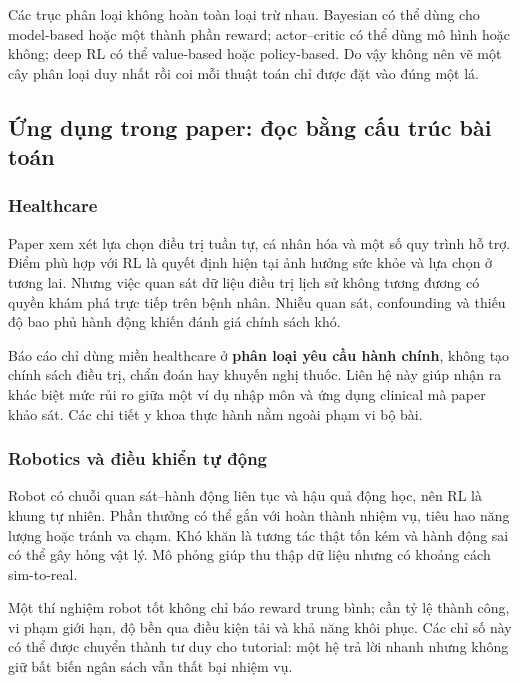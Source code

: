 Các trục phân loại không hoàn toàn loại trừ nhau. Bayesian có thể dùng
cho model-based hoặc một thành phần reward; actor--critic có thể dùng mô
hình hoặc không; deep RL có thể value-based hoặc policy-based. Do vậy
không nên vẽ một cây phân loại duy nhất rồi coi mỗi thuật toán chỉ được
đặt vào đúng một lá.

\subsection{Ứng dụng trong paper: đọc bằng cấu trúc bài
toán}\label{ux1ee9ng-dux1ee5ng-trong-paper-ux111ux1ecdc-bux1eb1ng-cux1ea5u-truxfac-buxe0i-touxe1n}

\subsubsection{Healthcare}\label{healthcare}

Paper xem xét lựa chọn điều trị tuần tự, cá nhân hóa và một số quy trình
hỗ trợ. Điểm phù hợp với RL là quyết định hiện tại ảnh hưởng sức khỏe và
lựa chọn ở tương lai. Nhưng việc quan sát dữ liệu điều trị lịch sử không
tương đương có quyền khám phá trực tiếp trên bệnh nhân. Nhiễu quan sát,
confounding và thiếu độ bao phủ hành động khiến đánh giá chính sách khó.

Báo cáo chỉ dùng miền healthcare ở \textbf{phân loại yêu cầu hành
chính}, không tạo chính sách điều trị, chẩn đoán hay khuyến nghị thuốc.
Liên hệ này giúp nhận ra khác biệt mức rủi ro giữa một ví dụ nhập môn và
ứng dụng clinical mà paper khảo sát. Các chi tiết y khoa thực hành nằm
ngoài phạm vi bộ bài.

\subsubsection{Robotics và điều khiển tự
động}\label{robotics-vuxe0-ux111iux1ec1u-khiux1ec3n-tux1ef1-ux111ux1ed9ng}

Robot có chuỗi quan sát--hành động liên tục và hậu quả động học, nên RL
là khung tự nhiên. Phần thưởng có thể gắn với hoàn thành nhiệm vụ, tiêu
hao năng lượng hoặc tránh va chạm. Khó khăn là tương tác thật tốn kém và
hành động sai có thể gây hỏng vật lý. Mô phỏng giúp thu thập dữ liệu
nhưng có khoảng cách sim-to-real.

Một thí nghiệm robot tốt không chỉ báo reward trung bình; cần tỷ lệ
thành công, vi phạm giới hạn, độ bền qua điều kiện tải và khả năng khôi
phục. Các chỉ số này có thể được chuyển thành tư duy cho tutorial: một
hệ trả lời nhanh nhưng không giữ bất biến ngân sách vẫn thất bại nhiệm
vụ.

